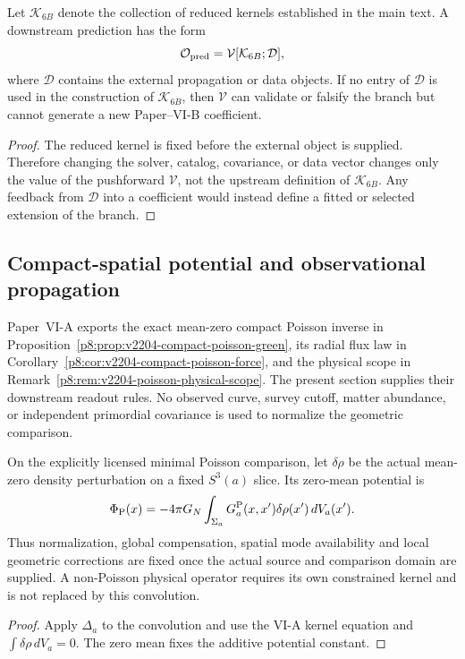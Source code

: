 \documentclass[12pt,a4paper]{article}
\begin{document}
\begin{theorem}
\label{p9:thm:no-selector-boundary-clean}
Let $\mathcal K_{6B}$ denote the collection of reduced kernels established
in the main text.  A downstream prediction has the form
\[
\mathcal O_{\rm pred}=\mathcal V[\mathcal K_{6B};\mathcal D],
\]
where $\mathcal D$ contains the external propagation or data objects.  If no
entry of $\mathcal D$ is used in the construction of $\mathcal K_{6B}$,
then $\mathcal V$ can validate or falsify the branch but cannot generate a new
Paper--VI-B coefficient.
\end{theorem}

\begin{proof}
The reduced kernel is fixed before the external object is supplied.  Therefore
changing the solver, catalog, covariance, or data vector changes only the value
of the pushforward $\mathcal V$, not the upstream definition of
$\mathcal K_{6B}$.  Any feedback from $\mathcal D$ into a coefficient would
instead define a fitted or selected extension of the branch.
\end{proof}

\subsection{Compact-spatial potential and observational propagation}
\label{p9:sec:v2204-compact-propagation-readout}

Paper~VI-A exports the exact mean-zero compact Poisson inverse in
Proposition~\ref{p8:prop:v2204-compact-poisson-green}, its radial flux law in
Corollary~\ref{p8:cor:v2204-compact-poisson-force}, and the physical scope in
Remark~\ref{p8:rem:v2204-poisson-physical-scope}. The present section supplies
their downstream readout rules. No observed curve, survey cutoff, matter
abundance, or independent primordial covariance is used to normalize the
geometric comparison.

\begin{proposition}
\label{p9:prop:v2204-compact-potential-benchmark}
On the explicitly licensed minimal Poisson comparison, let $\delta\rho$ be
the actual mean-zero density perturbation on a fixed $S^3(a)$ slice. Its
zero-mean potential is
\[
 \Phi_{\rm P}(x)
 =-4\pi G_N\int_{\Sigma_a}G_a^{\rm P}(x,x')\delta\rho(x')\,dV_a(x').
\]
Thus normalization, global compensation, spatial mode availability and local
geometric corrections are fixed once the actual source and comparison
domain are supplied. A non-Poisson physical operator requires its own
constrained kernel and is not replaced by this convolution.
\end{proposition}
\begin{proof}
Apply $\Delta_a$ to the convolution and use the VI-A kernel equation and
$\int\delta\rho\,dV_a=0$. The zero mean fixes the additive potential constant.
\end{proof}
\end{document}
